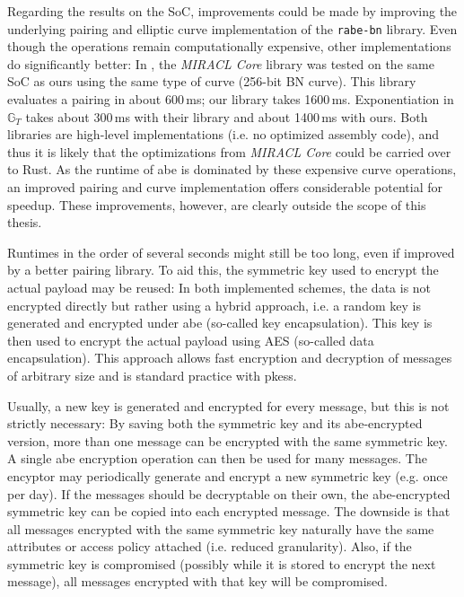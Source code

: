 Regarding the results on the SoC, improvements could be made by improving the underlying pairing and elliptic curve implementation of the \texttt{rabe-bn} library.
Even though the operations remain computationally expensive, other implementations do significantly better:
In \cite{scott_deployment_2020}, the \emph{MIRACL Core} library was tested on the same SoC as ours using the same type of curve (256-bit BN curve).
This library evaluates a pairing in about 600\,ms; our library takes 1600\,ms. 
Exponentiation in $\mathbb{G}_T$ takes about 300\,ms with their library and about 1400\,ms with ours. 
Both libraries are high-level implementations (i.e. no optimized assembly code), and thus it is likely that the optimizations from \emph{MIRACL Core} could be carried over to Rust.
As the runtime of \acrshort{abe} is dominated by these expensive curve operations, an improved pairing and curve implementation offers considerable potential for speedup.
These improvements, however, are clearly outside the scope of this thesis.

Runtimes in the order of several seconds might still be too long, even if improved by a better pairing library.
To aid this, the symmetric key used to encrypt the actual payload may be reused:
In both implemented schemes, the data is not encrypted directly but rather using a hybrid approach, i.e. a random key is generated and encrypted under \acrshort{abe} (so-called key encapsulation).
This key is then used to encrypt the actual payload using AES (so-called data encapsulation).
This approach allows fast encryption and decryption of messages of arbitrary size and is standard practice with \glspl{pkes}.

Usually, a new key is generated and encrypted for every message, but this is not strictly necessary:
By saving both the symmetric key and its \acrshort{abe}-encrypted version, more than one message can be encrypted with the same symmetric key.
A single \acrshort{abe} encryption operation can then be used for many messages.
The encyptor may periodically generate and encrypt a new symmetric key (e.g. once per day).
If the messages should be decryptable on their own, the \acrshort{abe}-encrypted symmetric key can be copied into each encrypted message.
The downside is that all messages encrypted with the same symmetric key naturally have the same attributes or access policy attached (i.e. reduced granularity).
Also, if the symmetric key is compromised (possibly while it is stored to encrypt the next message), all messages encrypted with that key will be compromised.

